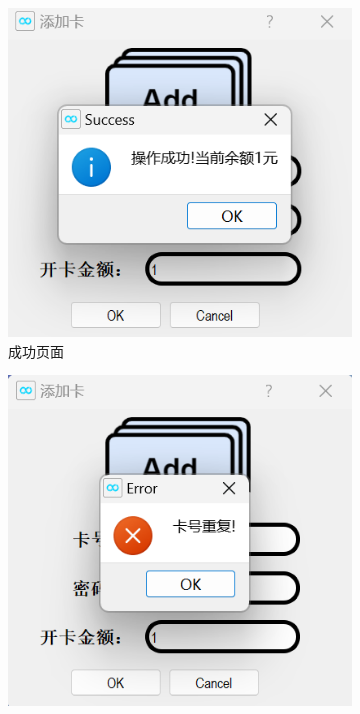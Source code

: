 \documentclass{article}
\begin{document}
    \begin{figure}[htbp]
        \centering
        \begin{subfigure}{0.24\linewidth}
            \centering
            \includegraphics[width=\linewidth]{figure/add_success.png}
            \caption{成功页面}
            \label{add_success}
        \end{subfigure}
        \centering
        \begin{subfigure}{0.24\linewidth}
            \centering
            \includegraphics[width=\linewidth]{figure/add_repeat.png}

\end{subfigure}
\end{figure}
\end{document}
